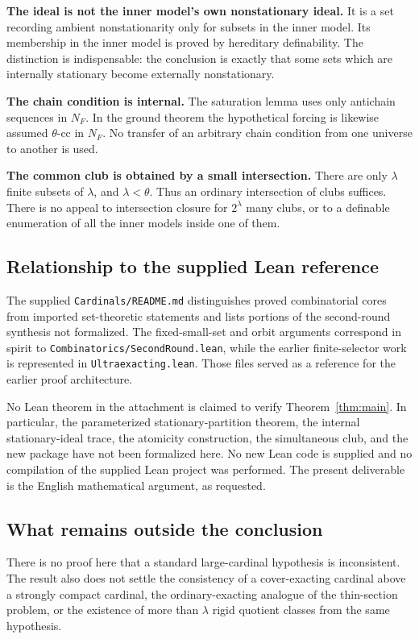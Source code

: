 \documentclass[11pt,letterpaper]{article}
\theoremstyle{definition}
\numberwithin{equation}{section}
\begin{document}
\textbf{The ideal is not the inner model's own nonstationary ideal.}
It is a set recording ambient nonstationarity only for subsets in the inner model. Its membership in the inner model is proved by hereditary definability. The distinction is indispensable: the conclusion is exactly that some sets which are internally stationary become externally nonstationary.

\textbf{The chain condition is internal.}
The saturation lemma uses only antichain sequences in $N_F$. In the ground theorem the hypothetical forcing is likewise assumed $\theta$-cc in $N_F$. No transfer of an arbitrary chain condition from one universe to another is used.

\textbf{The common club is obtained by a small intersection.}
There are only $\lambda$ finite subsets of $\lambda$, and $\lambda<\theta$. Thus an ordinary intersection of clubs suffices. There is no appeal to intersection closure for $2^\lambda$ many clubs, or to a definable enumeration of all the inner models inside one of them.

\subsection{Relationship to the supplied Lean reference}

The supplied \nolinkurl{Cardinals/README.md} distinguishes proved combinatorial cores from imported set-theoretic statements and lists portions of the second-round synthesis not formalized. The fixed-small-set and orbit arguments correspond in spirit to \nolinkurl{Combinatorics/SecondRound.lean}, while the earlier finite-selector work is represented in \nolinkurl{Ultraexacting.lean}. Those files served as a reference for the earlier proof architecture.

No Lean theorem in the attachment is claimed to verify Theorem~\ref{thm:main}. In particular, the parameterized stationary-partition theorem, the internal stationary-ideal trace, the atomicity construction, the simultaneous club, and the new package have not been formalized here. No new Lean code is supplied and no compilation of the supplied Lean project was performed. The present deliverable is the English mathematical argument, as requested.

\subsection{What remains outside the conclusion}

There is no proof here that a standard large-cardinal hypothesis is inconsistent. The result also does not settle the consistency of a cover-exacting cardinal above a strongly compact cardinal, the ordinary-exacting analogue of the thin-section problem, or the existence of more than $\lambda$ rigid quotient classes from the same hypothesis.
\end{document}
